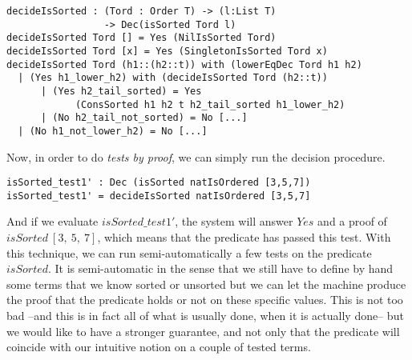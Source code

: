 \begin{lstlisting}
decideIsSorted : (Tord : Order T) -> (l:List T) 
                 -> Dec(isSorted Tord l)
decideIsSorted Tord [] = Yes (NilIsSorted Tord)
decideIsSorted Tord [x] = Yes (SingletonIsSorted Tord x)
decideIsSorted Tord (h1::(h2::t)) with (lowerEqDec Tord h1 h2)
  | (Yes h1_lower_h2) with (decideIsSorted Tord (h2::t))
      | (Yes h2_tail_sorted) = Yes 
      		(ConsSorted h1 h2 t h2_tail_sorted h1_lower_h2) 
      | (No h2_tail_not_sorted) = No [...]
  | (No h1_not_lower_h2) = No [...]
\end{lstlisting}
Now, in order to do \emph{tests by proof}, we can simply run the decision procedure.

\begin{lstlisting}
isSorted_test1' : Dec (isSorted natIsOrdered [3,5,7])
isSorted_test1' = decideIsSorted natIsOrdered [3,5,7] 
\end{lstlisting}
And if we evaluate $isSorted\_test1'$, the system will answer $Yes$ and a proof of $isSorted\ [3,\ 5,\ 7]$, which means that the predicate has passed this test. With this technique, we can run semi-automatically a few tests on the predicate $isSorted$. It is semi-automatic in the sense that we still have to define by hand some terms that we know sorted or unsorted but we can let the machine produce the proof that the predicate holds or not on these specific values. This is not too bad --and this is in fact all of what is usually done, when it is actually done-- but we would like to have a stronger guarantee, and not only that the predicate will coincide with our intuitive notion on a couple of tested terms.





